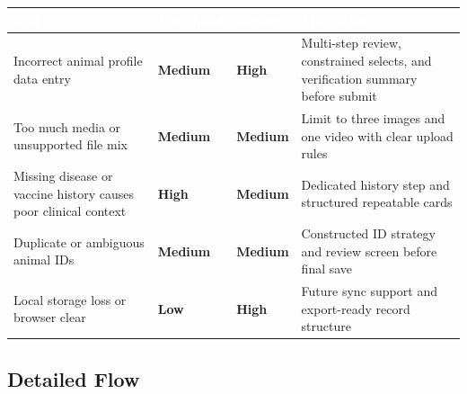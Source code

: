 \documentclass[12pt]{article}
\begin{document}
\begin{longtable}{|p{3.8cm}|p{2.5cm}|p{2.5cm}|p{4cm}|}
\hline
\rowcolor{headerblue}\textcolor{white}{\textbf{Risk}} & \textcolor{white}{\textbf{Likelihood}} & \textcolor{white}{\textbf{Impact}} & \textcolor{white}{\textbf{Mitigation}} \\
\hline
Incorrect animal profile data entry & \textcolor{medrisk}{\textbf{Medium}} & \textcolor{highrisk}{\textbf{High}} & Multi-step review, constrained selects, and verification summary before submit \\
\hline
\rowcolor{rowgray}
Too much media or unsupported file mix & \textcolor{medrisk}{\textbf{Medium}} & \textcolor{medrisk}{\textbf{Medium}} & Limit to three images and one video with clear upload rules \\
\hline
Missing disease or vaccine history causes poor clinical context & \textcolor{highrisk}{\textbf{High}} & \textcolor{medrisk}{\textbf{Medium}} & Dedicated history step and structured repeatable cards \\
\hline
\rowcolor{rowgray}
Duplicate or ambiguous animal IDs & \textcolor{medrisk}{\textbf{Medium}} & \textcolor{medrisk}{\textbf{Medium}} & Constructed ID strategy and review screen before final save \\
\hline
Local storage loss or browser clear & \textcolor{lowrisk}{\textbf{Low}} & \textcolor{highrisk}{\textbf{High}} & Future sync support and export-ready record structure \\
\hline
\end{longtable}

\subsection{Detailed Flow}
\end{document}
